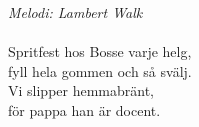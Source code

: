 {\footnotesize\textit{Melodi: Lambert Walk}}\\
\\
Spritfest hos Bosse varje helg,\\
fyll hela gommen och så svälj.\\
Vi slipper hemmabränt,\\
för pappa han är docent.\\
